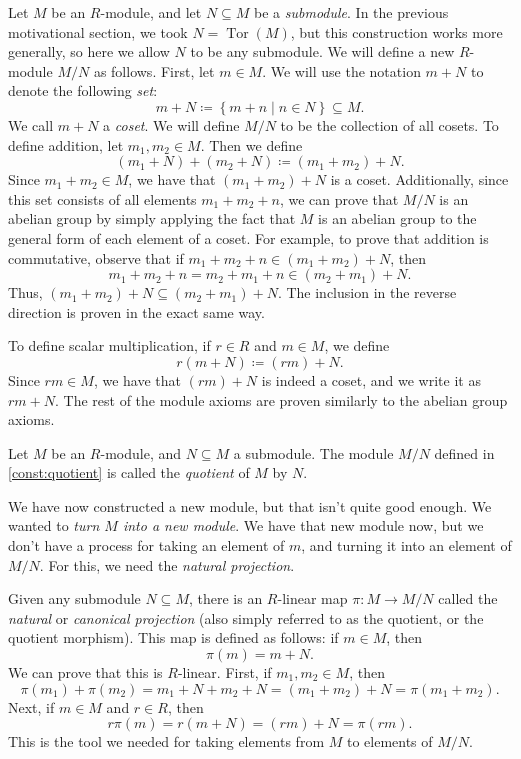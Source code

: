 \begin{construction}\label{const:quotient}
	Let $M$ be an $R$-module, and let $N\subseteq M$ be a \emph{submodule}. In the previous motivational section, we took $N = \operatorname{Tor} (M)$, but this construction works more generally, so here we allow $N$ to be any submodule. We will define a new $R$-module $M/N$ as follows. First, let $m\in M$. We will use the notation $m+N$ to denote the following \emph{set}:
	\[
		m+N \coloneqq \left\{ m+n \mid n\in N \right\} \subseteq M
	.\]
	We call $m+N$ a \emph{coset}. We will define $M/N$ to be the collection of all cosets. To define addition, let $m_1,m_2\in M$. Then we define
	\[
		(m_1 + N) + (m_2 + N) \coloneqq (m_1+m_2)+N
	.\]
	Since $m_1+m_2\in M$, we have that $(m_1+m_2)+N$ is a coset. Additionally, since this set consists of all elements $m_1+m_2+n$, we can prove that $M/N$ is an abelian group by simply applying the fact that $M$ is an abelian group to the general form of each element of a coset. For example, to prove that addition is commutative, observe that if $m_1 + m_2 + n\in (m_1+m_2)+N$, then
	\[
		m_1 + m_2 + n = m_2 + m_1 + n \in (m_2 + m_1) + N
	.\]
	Thus, $(m_1+m_2)+N \subseteq (m_2 + m_1) + N$. The inclusion in the reverse direction is proven in the exact same way.

	To define scalar multiplication, if $r\in R$ and $m\in M$, we define
	\[
		r(m+N) \coloneqq (r m)+N
	.\]
	Since $r m\in M$, we have that $(r m)+N$ is indeed a coset, and we write it as $r m+N$. The rest of the module axioms are proven similarly to the abelian group axioms.
\end{construction}

\begin{definition}\label{dfn:quotient}
	Let $M$ be an $R$-module, and $N\subseteq M$ a submodule. The module $M/N$ defined in \cref{const:quotient} is called the \emph{quotient} of $M$ by $N$.
\end{definition}

We have now constructed a new module, but that isn't quite good enough. We wanted to \emph{turn $M$ into a new module}. We have that new module now, but we don't have a process for taking an element of $m$, and turning it into an element of $M/N$. For this, we need the \emph{natural projection}.

Given any submodule $N\subseteq M$, there is an $R$-linear map $\pi : M \to M/N$ called the \emph{natural} or \emph{canonical projection} (also simply referred to as the quotient, or the quotient morphism). This map is defined as follows: if $m\in M$, then
\[
	\pi (m) = m+N
.\]
We can prove that this is $R$-linear. First, if $m_1,m_2\in M$, then
\[
	\pi (m_1) + \pi (m_2) = m_1 + N + m_2 + N = (m_1 + m_2) + N = \pi (m_1 + m_2)
.\]
Next, if $m\in M$ and $r\in R$, then
\[
	r\pi (m) = r(m+N) = (r m)+N = \pi (r m)
.\]
This is the tool we needed for taking elements from $M$ to elements of $M/N$.

